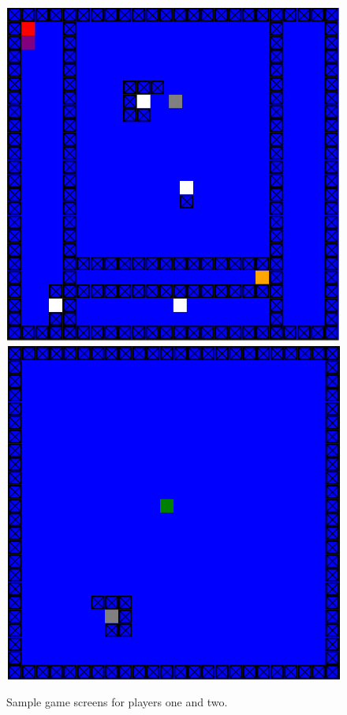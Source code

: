\begin{figure}
\includegraphics[scale=0.27]{playerview1.png} 
\includegraphics[scale=0.27]{playerview2.png}
\caption{Sample game screens for players one and two.}
\label{fig:player-screenshots}
\end{figure}

